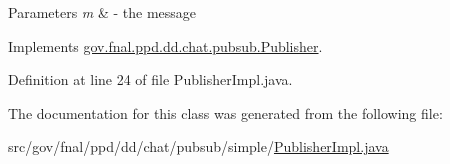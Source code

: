 \begin{DoxyParams}{Parameters}
{\em m} & -\/ the message \\
\hline
\end{DoxyParams}


Implements \hyperlink{interfacegov_1_1fnal_1_1ppd_1_1dd_1_1chat_1_1pubsub_1_1Publisher_a51c46e3fee04c1eb5a04b99a323d306b}{gov.\-fnal.\-ppd.\-dd.\-chat.\-pubsub.\-Publisher}.



Definition at line 24 of file Publisher\-Impl.\-java.



The documentation for this class was generated from the following file\-:\begin{DoxyCompactItemize}
\item 
src/gov/fnal/ppd/dd/chat/pubsub/simple/\hyperlink{PublisherImpl_8java}{Publisher\-Impl.\-java}\end{DoxyCompactItemize}

